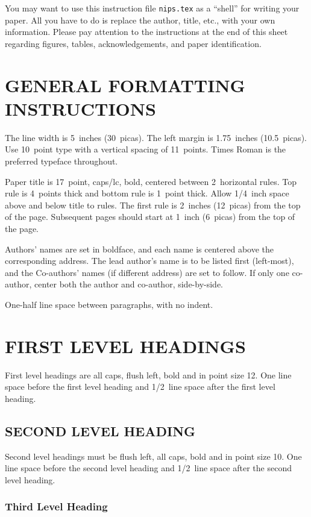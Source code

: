 You may want to use this instruction file \verb+nips.tex+ as a
``shell'' for writing your paper.  All you have to do is replace
the author, title, etc., with your own information.  Please pay
attention to the instructions at the end of this sheet regarding
figures, tables, acknowledgements, and paper identification.

\section{GENERAL FORMATTING INSTRUCTIONS}
\label{sec-format}

The line width is 5~inches (30~picas). The left margin is
1.75~inches (10.5~picas). Use 10~point type with a vertical spacing
of 11~points. Times Roman is the preferred typeface throughout.

Paper title is 17~point, caps/lc, bold, centered between
2~horizontal rules.  Top rule is 4~points thick and bottom rule is
1~point thick. Allow 1/4~inch space above and below title to rules.
The first rule is 2~inches (12~picas) from the top of the page.
Subsequent pages should start at 1~inch (6~picas) from the top of
the page. 

Authors' names are set in boldface, and each name is centered above
the corresponding address.   The lead author's name
is to be listed first (left-most), and the Co-authors' names (if
different address) are set to follow.  If only one co-author,
center both the author and co-author, side-by-side.


One-half line space between paragraphs, with no indent.

\section{FIRST LEVEL HEADINGS}

First level headings are all caps, flush left, bold and in point
size 12. One line space before the first level heading and 1/2~line
space after the first level heading.

\subsection{SECOND LEVEL HEADING}

Second level headings must be flush left, all caps, bold and in
point size 10. One line space before the second level heading and
1/2~line space after the second level heading.

\subsubsection{Third Level Heading}

